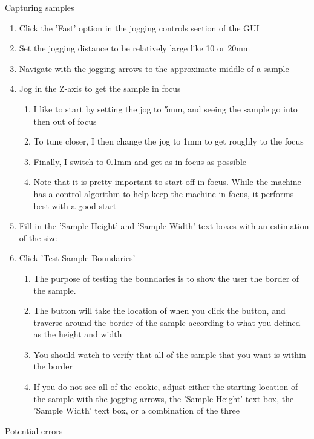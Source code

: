 \documentclass{article}
\begin{document}
\begin{outline}[enumerate]
\begin{enumerate}
	\end{enumerate}
\item Capturing samples
    \begin{enumerate}
    \item Click the 'Fast' option in the jogging controls section of the GUI
    \item Set the jogging distance to be relatively large like 10 or 20mm
    \item Navigate with the jogging arrows to the approximate middle of a sample
    \item Jog in the Z-axis to get the sample in focus
        \begin{enumerate}
        \item I like to start by setting the jog to 5mm, and seeing the sample go into then out of focus
        \item To tune closer, I then change the jog to 1mm to get roughly to the focus
        \item Finally, I switch to 0.1mm and get as in focus as possible
        \item Note that it is pretty important to start off in focus. While the machine has a control algorithm to help keep the machine in focus, it performs best with a good start
        \end{enumerate}
    \item Fill in the 'Sample Height' and 'Sample Width' text boxes with an estimation of the size
    \item Click 'Test Sample Boundaries'
        \begin{enumerate}
        \item The purpose of testing the boundaries is to show the user the border of the sample. 
        \item The button will take the location of when you click the button, and traverse around the border of the sample according to what you defined as the height and width
        \item You should watch to verify that all of the sample that you want is within the border
        \item If you do not see all of the cookie, adjust either the starting location of the sample with the jogging arrows, the 'Sample Height' text box, the 'Sample Width' text box, or a combination of the three
        \end{enumerate}
    \end{enumerate}
\item Potential errors
    \begin{enumerate}

\end{enumerate}
\end{outline}
\end{document}
